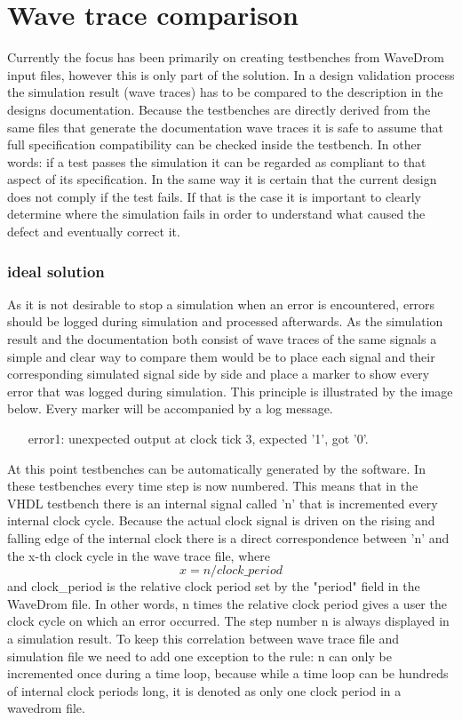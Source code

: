 \section{Wave trace comparison}
Currently the focus has been primarily on creating testbenches from WaveDrom input files, however this is only part of the solution. In a design validation process the simulation result (wave traces) has to be compared to the description in the designs documentation.
\npar
Because the testbenches are directly derived from the same files that generate the documentation wave traces it is safe to assume that full specification compatibility can be checked inside the testbench. In other words: if a test passes the simulation it can be regarded as compliant to that aspect of its specification. In the same way it is certain that the current design does not comply if the test fails. If that is the case it is important to clearly determine where the simulation fails in order to understand what caused the defect and eventually correct it.
\subsubsection{ideal solution}\label{TD:ideal_solution}
As it is not desirable to stop a simulation when an error is encountered, errors should be logged during simulation and processed afterwards. As the simulation result and the documentation both consist of wave traces of the same signals a simple and clear way to compare them would be to place each signal and their corresponding simulated signal side by side and place a marker to show every error that was logged during simulation. This principle is illustrated by the image below.
\newpage\noindent
Every marker will be accompanied by a log message.
\begin{customenv}\label{log}
	\begin{itemize}
		\item [error1:] unexpected output at clock tick 3, expected '1', got '0'.
	\end{itemize}
\end{customenv}\nline
At this point testbenches can be automatically generated by the software. In these testbenches every time step is now numbered. This means that in the VHDL testbench there is an internal signal called 'n' that is incremented every internal clock cycle. Because the actual clock signal is driven on the rising and falling edge of the internal clock there is a direct correspondence between 'n' and the x-th clock cycle in the wave trace file, where
\begin{equation}
	x = n/clock\_period
\end{equation}
and clock\_period is the relative clock period set by the "period" field in the WaveDrom file. In other words, n times the relative clock period gives a user the clock cycle on which an error occurred. The step number n is always displayed in a simulation result.
\npar
To keep this correlation between wave trace file and simulation file we need to add one exception to the rule: n can only be incremented once during a time loop, because while a time loop can be hundreds of internal clock periods long, it is denoted as only one clock period in a wavedrom file.
